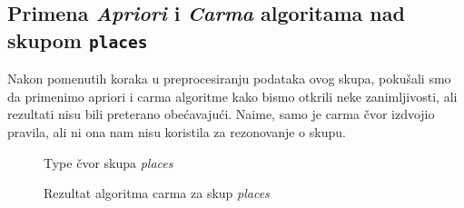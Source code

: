 \documentclass[a4paper,10pt]{article}
\begin{document}
% 	

\subsection{Primena \textit{Apriori} i \textit{Carma} algoritama nad skupom \texttt{places}}

Nakon pomenutih koraka u preprocesiranju podataka ovog skupa, pokušali smo da primenimo apriori i carma algoritme kako bismo otkrili
neke zanimljivosti, ali rezultati nisu bili preterano obećavajući. Naime, samo je carma čvor izdvojio pravila, ali ni ona nam nisu
koristila za rezonovanje o skupu. 


\begin{figure}[h!]
 \centering
 \caption{Type čvor skupa \textit{places}}
\end{figure}

\begin{figure}[h!]
 \centering
 \caption{Rezultat algoritma carma za skup \textit{places}}
\end{figure}
\end{document}
